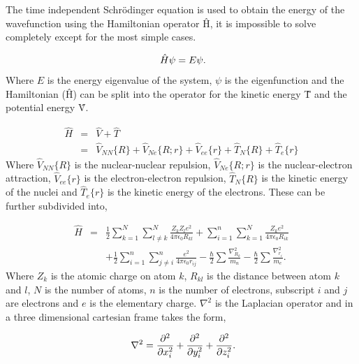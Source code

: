 The time independent Schr\"odinger equation\cite{Schrodinger} is used to obtain the energy of the wavefunction using the Hamiltonian operator \^H, it is impossible to solve completely except for the most simple cases.

\begin{equation}
\ \hat{H} \psi = E \psi \\.
\end{equation}
%
Where $E$ is the energy eigenvalue of the system, $\psi$ is the eigenfunction and the Hamiltonian (\^H) can be split into the operator for the kinetic energy \^T and the potential energy \^V.

\begin{eqnarray}
\hat{H} &=& \hat{V} + \hat{T} \\
\ &=& \hat{V}_{NN} \lbrace R \rbrace + \hat{V}_{Ne}\lbrace R;r \rbrace + \hat{V}_{ee} \lbrace r \rbrace + \hat{T}_N \lbrace R \rbrace + \hat{T}_e\lbrace r \rbrace \label{eq:pre_BO}
\end{eqnarray}
%
Where $\hat{V}_{NN} \lbrace R \rbrace$ is the nuclear-nuclear repulsion, $\hat{V}_{Ne}\lbrace R;r \rbrace$ is the nuclear-electron attraction, $\hat{V}_{ee} \lbrace r \rbrace$ is the electron-electron repulsion, $\hat{T}_N \lbrace R \rbrace$ is the kinetic energy of the nuclei and $\hat{T}_e\lbrace r \rbrace$ is the kinetic energy of the electrons.  These can be further subdivided into,


\begin{eqnarray} \label{eq:full_hamiltonian}
\hat{H} &=& \frac{1}{2} \sum_{k=1}^{N} \sum_{l\neq k}^{N} \frac{Z_k Z_l e^2}{4 \pi \epsilon_0 R_{kl}} 
+ \sum_{i=1}^{n} \sum_{k= 1}^{N} \frac{Z_k e^2}{4 \pi \epsilon_0 R_{ik}} \nonumber \\
& & + \frac{1}{2} \sum_{i=1}^{n} \sum_{j\neq i}^{n} \frac{e^2}{4 \pi \epsilon_0 r_{ij}} 
- \frac{\hbar}{2} \sum \frac{\nabla^2_{R_k}}{m_n} - \frac{\hbar}{2} \sum \frac{\nabla^2_{r_i}}{m_e} .
\end{eqnarray}
%
Where $Z_k$ is the atomic charge on atom $k$, $R_{kl}$ is the distance between atom $k$ and $l$, $N$ is the number of atoms, $n$ is the number of electrons, subscript $i$ and $j$ are electrons and $e$ is the elementary charge.  $\nabla^2$ is the Laplacian operator and in a three dimensional cartesian frame takes the form,

\begin{equation}
\ \nabla^2 = \frac{\partial^2}{\partial x_i^2} + \frac{\partial^2}{\partial y_i^2} + \frac{\partial^2}{\partial z_i^2} \\.
\end{equation}


